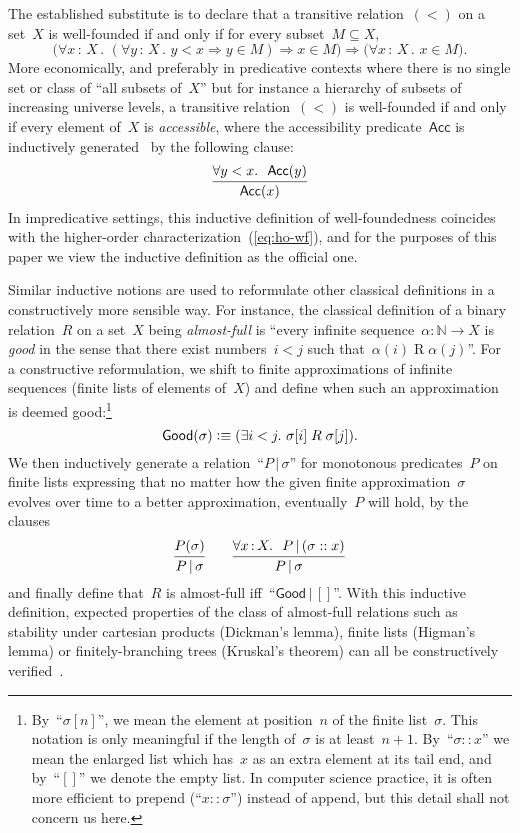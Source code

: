 \documentclass[oneside,reqno]{amsart}
\theoremstyle{definition}
\theoremstyle{plain}
\theoremstyle{remark}
\newcommand{\NN}{\mathbb{N}}
\newcommand{\defeqv}{\vcentcolon\equiv}
\renewcommand{\_}{\mathpunct{.}\,}
\newcommand{\?}{\,{:}\,}
\begin{document}
The established substitute is to declare that a transitive relation~$({<})$ on a set~$X$
is well-founded if and only if for every subset~$M \subseteq X$,
\begin{equation}\label{eq:ho-wf}\tag{$\star$}
\bigl(\forall x\?X\_ (\forall y\?X\_ y < x \Rightarrow y \in M) \Rightarrow x \in
M\bigr) \Longrightarrow \bigl(\forall x\?X\_ x \in M\bigr).
\end{equation}
More economically, and preferably in predicative contexts where there is no
single set or class of ``all subsets of~$X$'' but for instance a
hierarchy of subsets of increasing universe levels, a transitive relation~$({<})$ is
well-founded if and only if every element of~$X$ is \emph{accessible}, where
the accessibility predicate~$\mathsf{Acc}$ is inductively generated~\cite{xxx}
by the following clause:
\[
  \infer{\mathsf{Acc}(x)}{\forall y<x\_\ \mathsf{Acc}(y)}
\]
In impredicative settings, this inductive definition of well-foundedness
coincides with the higher-order characterization~(\ref{eq:ho-wf}), and for the
purposes of this paper we view the inductive definition as the official one.

Similar inductive notions are used to reformulate other classical definitions
in a constructively more sensible way. For instance, the classical definition
of a binary relation~$R$ on a set~$X$ being \emph{almost-full} is ``every
infinite sequence~$\alpha : \NN \to X$ is \emph{good} in the sense that there
exist numbers~$i < j$ such that~$\alpha(i) \mathrel{R} \alpha(j)$''.
For a constructive reformulation, we shift to finite approximations of
infinite sequences (finite lists of elements of~$X$) and define when such an
approximation is deemed good:\footnote{By~``$\sigma[n]$'', we mean the element
at position~$n$ of the finite list~$\sigma$. This notation is only meaningful
if the length of~$\sigma$ is at least~$n+1$. By~``$\sigma :: x$'' we mean the
enlarged list which has~$x$ as an extra element at its tail end, and by~``$[]$'' we
denote the empty list. In computer science practice, it is often more efficient
to prepend (``$x :: \sigma$'') instead of append, but this detail shall not
concern us here.}
\[ \mathsf{Good}(\sigma) \defeqv (\exists i<j\_ \sigma[i] \mathrel{R} \sigma[j]). \]
We then inductively generate a relation~``$P \,|\, \sigma$'' for monotonous
predicates~$P$ on finite lists expressing that no matter how the given finite
approximation~$\sigma$ evolves over time to a better approximation,
eventually~$P$ will hold, by the clauses
\[
  \infer{P \,|\, \sigma}{P(\sigma)}
  \qquad
  \infer{P \,|\, \sigma}{\forall x \? X\_\ P \,|\, (\sigma :: x)}
\]
and finally define that~$R$ is almost-full iff~``$\mathsf{Good} \,|\, []$''.
With this inductive definition, expected properties of the class of almost-full
relations such as stability under cartesian products (Dickman's lemma),
finite lists (Higman's lemma) or finitely-branching trees (Kruskal's theorem)
can all be constructively verified~\cite{xxx}.
\end{document}
